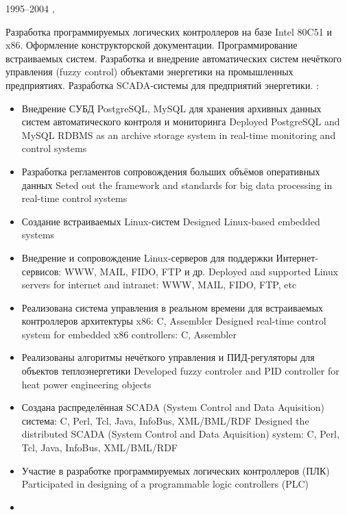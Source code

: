 \documentclass[11pt,a4paper,sans]{moderncv}        %
\begin{document}
\cventry
{1995--2004}
{\leadsoftdeveloper}
{\protect{}}
{\citykirov, \country}{}
{
{Разработка программируемых логических контроллеров на базе Intel 80C51 и x86. Оформление конструкторской документации. Программирование встраиваемых систем. Разработка и внедрение автоматических систем нечёткого управления (fuzzy control) объектами энергетики на промышленных предприятиях. Разработка SCADA-системы для предприятий энергетики.}
{}\newline{}
\achievements:
\begin{itemize}
	\item {}
		{Внедрение СУБД PostgreSQL, MySQL для хранения архивных данных систем автоматического контроля и мониторинга}
		{Deployed PostgreSQL and MySQL RDBMS as an archive storage system in real-time monitoring and control systems}
	\item {}
		{Разработка регламентов сопровождения больших объёмов оперативных данных}
		{Seted out the framework and standards for big data processing in real-time control systems}
	\item {}
		{Создание встраиваемых Linux-систем}
		{Designed Linux-based embedded systems}
	\item {}
		{Внедрение и сопровождение Linux-серверов для поддержки Интернет-сервисов: WWW, MAIL, FIDO, FTP и др.}
		{Deployed and supported Linux servers for internet and intranet: WWW, MAIL, FIDO, FTP, etc}
	\item {}
		{Реализована система управления в реальном времени для встраиваемых контроллеров архитектуры x86: C, Assembler}
		{Designed real-time control system for embedded x86 controllers: C, Assembler}
	\item {}
		{Реализованы алгоритмы нечёткого управления и ПИД-регуляторы для объектов теплоэнергетики}
		{Developed fuzzy controler and PID controller for heat power engineering objects}
	\item {}
		{Создана распределённая SCADA (System Control and Data Aquisition) система: C, Perl, Tcl, Java, InfoBus, XML/BML/RDF}
		{Designed the distributed SCADA (System Control and Data Aquisition) system: C, Perl, Tcl, Java, InfoBus, XML/BML/RDF }
	\item {}
		{Участие в разработке программируемых логических контроллеров (ПЛК)}
		{Participated in designing of a programmable logic controllers (PLC)}
	\item {}

\end{itemize}}
\end{document}
